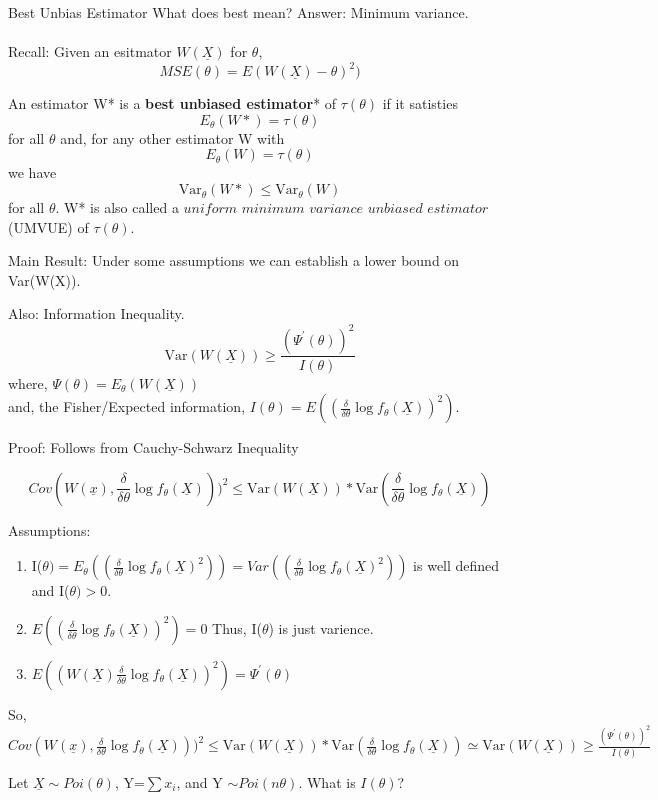 \documentclass[11pt,fleqn]{book} %
\begin{document}
\begin{section}{Best Unbias Estimator}
	What does best mean? Answer: Minimum variance. \\
\\
	Recall: Given an esitmator $W(\underline{X})$ for $\theta$,
	\[
		MSE(\theta)= E(W(\underline{X})-\theta)^2)
	\]
\begin{definition}
	An estimator W* is a \textbf{best unbiased estimator}* of $\tau(\theta)$ if it satisties
	\[
		E_\theta (W*) = \tau(\theta)
	\] 
	for all $\theta$ and, for any other estimator W with 
	\[
		E_\theta (W) = \tau(\theta)
	\]
	we have 
	\[
		\text{Var}_\theta (W*) \le \text{Var}_\theta (W)
	\]
	for all $\theta$. W* is also called a $\textit{uniform minimum variance unbiased estimator}$ (UMVUE) of $\tau(\theta)$.
\end{definition}
Main Result: Under some assumptions we can establish a lower bound on Var(W(X)). 

\begin{theorem}
	Also: Information Inequality. 
	$$\text{Var}(W(\underline{X})) \ge \frac{(\Psi^\prime(\theta))^2}{I(\theta)}$$
	where, 
	$\Psi(\theta)=E_\theta(W(\underline{X}))$\\
	and, 
	the Fisher/Expected information, $I(\theta)=E\left((\frac{\delta}{\delta \theta}\log f_\theta(\underline{X}))^2 \right)$.
	
\end{theorem}
Proof: Follows from Cauchy-Schwarz Inequality

$$Cov(W(\underline{x}), \frac{\delta}{\delta\theta}\log f_\theta(\underline{X})))^2 \le \text{Var}(W(\underline{X}))*\text{Var}(\frac{\delta}{\delta\theta}\log f_\theta(\underline{X})) $$

Assumptions:
\begin{enumerate}
	\item I($\theta)=E_\theta \left((\frac{\delta}{\delta \theta}\log f_\theta(\underline{X})^2)\right) = Var((\frac{\delta}{\delta \theta}\log f_\theta(\underline{X})^2))$ is well defined and I($\theta)>0$.
	\item $E \left((\frac{\delta}{\delta \theta}\log f_\theta(\underline{X}))^2 \right)=0$ Thus, I($\theta$) is just varience.
	\item $E \left((W(\underline{X})\frac{\delta}{\delta \theta}\log f_\theta(\underline{X}))^2 \right)=\Psi^\prime(\theta)$
\end{enumerate}
So, \\
$Cov(W(\underline{x}), \frac{\delta}{\delta\theta}\log f_\theta(\underline{X})))^2 \le \text{Var}(W(\underline{X}))*\text{Var}(\frac{\delta}{\delta\theta}\log f_\theta(\underline{X})) \simeq \text{Var}(W(\underline{X})) \ge \frac{(\Psi^\prime(\theta))^2}{I(\theta)}$
\begin{exercise}
	Let $\underline{X} \sim Poi(\theta)$, Y=$\sum x_i$, and Y $\sim Poi(n\theta)$. What is $I(\theta)$?


\end{exercise}
\end{section}
\end{document}
